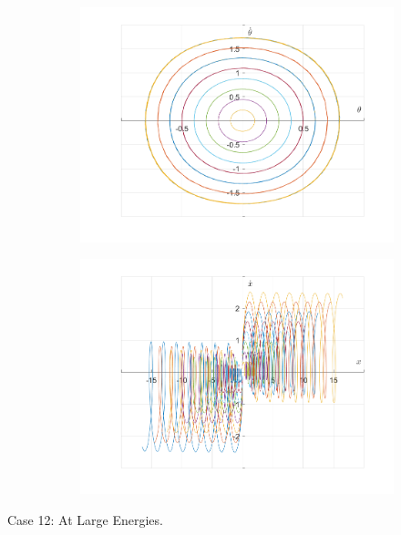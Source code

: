 \documentclass{article}
\begin{document}
	\begin{figure}[h!]
		\centering
		\begin{subfigure}[b]{0.48\linewidth}
			\includegraphics[width=\linewidth]{./SmallOscillations/S12/F5.png}
		\end{subfigure}
		\begin{subfigure}[b]{0.48\linewidth}
			\includegraphics[width=\linewidth]{./SmallOscillations/S12/F6.png}
		\end{subfigure}
	\end{figure}
	\newpage
		Case 12:
	At Large Energies.	
\end{document}
